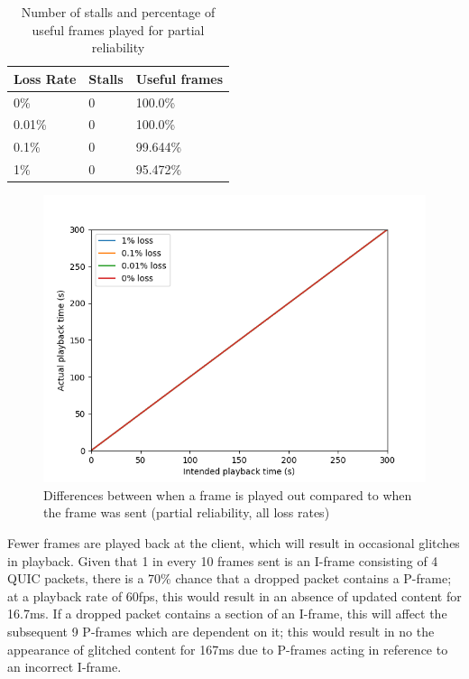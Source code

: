 \documentclass{mpaper}
\begin{document}
\begin{table}[h!]
\centering
\label{stalls-data-par}
\begin{center}
\begin{tabular}{|p{2cm}|p{2cm}|p{2cm}|}
\hline
Loss Rate & Stalls & Useful frames\\ \hline
0\% & 0 & 100.0\% \\ \hline
0.01\%  & 0 & 100.0\% \\ \hline
0.1\%  & 0 & 99.644\% \\ \hline
1\%  & 0 & 95.472\% \\ \hline

\end{tabular}
\caption{Number of stalls and percentage of useful frames played for partial reliability}
\label{par-playback-stats}
\end{center}
\end{table}

\begin{figure}[h]
\includegraphics[scale=0.5]{images/graphics-partial/50ms-relative-offsets-combined-PARTIAL.png}
\centering
\caption{Differences between when a frame is played out compared to when the frame was sent (partial reliability, all loss rates)}
\label{playback-par}
\end{figure}

Fewer frames are played back at the client, which will result in occasional glitches in playback. Given that 1 in every 10 frames sent is an I-frame consisting of 4 QUIC packets, there is a 70\% chance that a dropped packet contains a P-frame; at a playback rate of 60fps, this would result in an absence of updated content for 16.7ms. If a dropped packet contains a section of an I-frame, this will affect the subsequent 9 P-frames which are dependent on it; this would result in no the appearance of glitched content for 167ms due to P-frames acting in reference to an incorrect I-frame.
\end{document}
